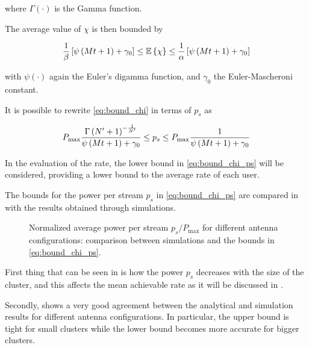 \noindent
where $\Gamma\left(\cdot\right)$ is the Gamma function.

The average value of $\chi$ is then bounded by

\begin{equation} \label{eq:bound_chi}
    \frac{1}{\beta}\left[\psi\left(Mt + 1\right) + \gamma_0\right] \leq
    \mathbb{E}\left\{\chi\right\} \leq
    \frac{1}{\alpha}\left[\psi\left(Mt + 1\right) + \gamma_0\right]
\end{equation}

\noindent
with $\psi\left(\cdot\right)$ again the Euler's digamma function, and $\gamma_0$ the Euler-Mascheroni
constant.

It is possible to rewrite \eqref{eq:bound_chi} in terms of $p_s$ as

\begin{equation} \label{eq:bound_chi_ps}
    P_{\max} \frac{\Gamma\left(N^{\prime} + 1\right)^{-\frac{1}{N^{\prime}}}}
        {\psi\left(Mt + 1\right) + \gamma_0} \leq p_s \leq
        P_{\max}\frac{1}{\psi\left(Mt + 1\right) + \gamma_0}
\end{equation}

In the evaluation of the rate, the lower bound in \eqref{eq:bound_chi_ps} will
be considered, providing a lower bound to the average rate of each user.

The bounds for the power per stream $p_s$ in \eqref{eq:bound_chi_ps} are
compared in  with the results obtained through simulations.

\begin{figure}[t]
\begin{center}
    
    \restoregeometry
\end{center}
\caption{Normalized average power per stream $p_s / P_{\max}$ for different
antenna configurations: comparison between simulations and the bounds in
\eqref{eq:bound_chi_ps}.}
\label{fig:bound_chi}
\end{figure}

First thing that can be seen in  is how the power $p_s$
decreases with the size of the cluster, and this affects the mean achievable
rate as it will be discussed in .

Secondly,  shows a very good agreement between the
analytical and simulation results for different antenna configurations. In
particular, the upper bound is tight for small clusters while the lower bound
becomes more accurate for bigger clusters.

